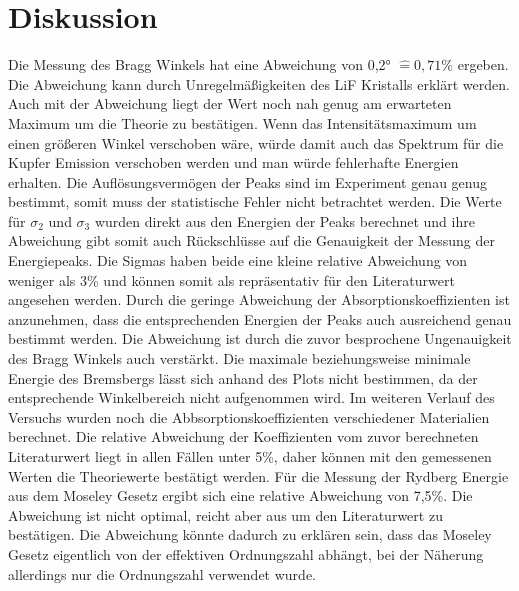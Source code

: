 \section{Diskussion}
\label{sec:Diskussion}
Die Messung des Bragg Winkels hat eine Abweichung von 0,2° $\hat{=} 0,71\%$ ergeben.
Die Abweichung kann durch Unregelmäßigkeiten des LiF Kristalls erklärt werden.
Auch mit der Abweichung liegt der Wert noch nah genug am erwarteten Maximum um die Theorie zu bestätigen.
Wenn das Intensitätsmaximum um einen größeren Winkel verschoben wäre, würde damit auch das Spektrum für die Kupfer Emission verschoben werden und man würde fehlerhafte Energien erhalten.
Die Auflösungsvermögen der Peaks sind im Experiment genau genug bestimmt, somit muss der statistische Fehler nicht betrachtet werden.
Die Werte für $\sigma_2$ und $\sigma_3$ wurden direkt aus den Energien der Peaks berechnet und ihre Abweichung gibt somit auch Rückschlüsse auf die Genauigkeit der Messung der Energiepeaks.
Die Sigmas haben beide eine kleine relative Abweichung von weniger als 3\% und können somit als repräsentativ für den Literaturwert angesehen werden.
Durch die geringe Abweichung der Absorptionskoeffizienten ist anzunehmen, dass die entsprechenden Energien der Peaks auch ausreichend genau bestimmt werden.
Die Abweichung ist durch die zuvor besprochene Ungenauigkeit des Bragg Winkels auch verstärkt.
Die maximale beziehungsweise minimale Energie des Bremsbergs lässt sich anhand des Plots nicht bestimmen, da der entsprechende Winkelbereich nicht aufgenommen wird.
Im weiteren Verlauf des Versuchs wurden noch die Abbsorptionskoeffizienten verschiedener Materialien berechnet.
Die relative Abweichung der Koeffizienten vom zuvor berechneten Literaturwert liegt in allen Fällen unter 5\%, daher können mit den gemessenen Werten die Theoriewerte bestätigt werden.
Für die Messung der Rydberg Energie aus dem Moseley Gesetz ergibt sich eine relative Abweichung von 7,5\%. 
Die Abweichung ist nicht optimal, reicht aber aus um den Literaturwert zu bestätigen.
Die Abweichung könnte dadurch zu erklären sein, dass das Moseley Gesetz eigentlich von der effektiven Ordnungszahl abhängt, bei der Näherung allerdings nur die Ordnungszahl verwendet wurde.


